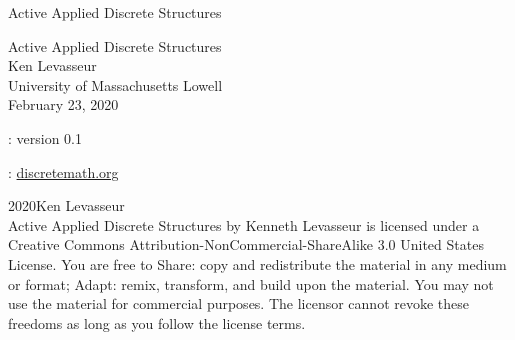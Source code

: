 \documentclass[oneside,10pt,]{book}
\newcommand{\titlepagefont}{\relax}
\numberwithin{equation}{section}
\begin{document}
\frontmatter
\thispagestyle{empty}
{\titlepagefont\centering
\vspace*{0.28\textheight}
{\Huge Active Applied Discrete Structures}\\}
\clearpage
\thispagestyle{empty}
\null%
\clearpage
\thispagestyle{empty}
{\titlepagefont\centering
\vspace*{0.14\textheight}
{\Huge Active Applied Discrete Structures}\\[3\baselineskip]
{\Large Ken Levasseur}\\[0.5\baselineskip]
{\Large University of Massachusetts Lowell}\\[3\baselineskip]
{\Large February 23, 2020}\\}
\clearpage
\thispagestyle{empty}
\hypertarget{g:colophon:idm198378343824}{}
: version 0.1\par\medskip
{}: \href{http:\slash{}\slash{}discretemath.org}{discretemath.org}\par\medskip
\noindent\textcopyright{}2020\quad{}Ken Levasseur\\[0.5\baselineskip]
Active Applied Discrete Structures by Kenneth Levasseur is licensed under a Creative Commons Attribution-NonCommercial-ShareAlike 3.0 United States License. You are free to Share: copy and redistribute the material in any medium or format; Adapt: remix, transform, and build upon the material. You may not use the material for commercial purposes.  The licensor cannot revoke these freedoms as long as you follow the license terms.\par\medskip
{}
\null\clearpage
%
%
\typeout{************************************************}
\typeout{************************************************}
%
\end{document}
